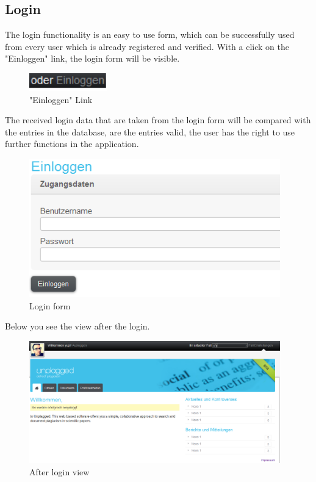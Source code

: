 \subsection{Login}

The login functionality is an easy to use form, which can be successfully used from every user which is already 
registered and verified. With a click on the "Einloggen" link, the login form will be visible.

\begin{figure}[!h]
  \centering
    \includegraphics[width=0.30\textwidth]{images/basic_functionalities/oderEinloggen.png}
  \caption{"Einloggen" Link}
  \label{fig:einloggen}
\end{figure}

The received login data that are taken from the login form will be compared with the entries in the database, are the 
entries valid, the user has the right to use further functions in the application.

\begin{figure}[!h]
  \centering
    \includegraphics[width=0.97\textwidth]{images/basic_functionalities/login_form.png}
  \caption{Login form}
  \label{fig:einloggen}
\end{figure}

Below you see the view after the login.

\begin{figure}[!h]
  \centering
    \includegraphics[width=0.97\textwidth]{images/basic_functionalities/after_login.png}
  \caption{After login view}
  \label{fig:after login view}
\end{figure}

